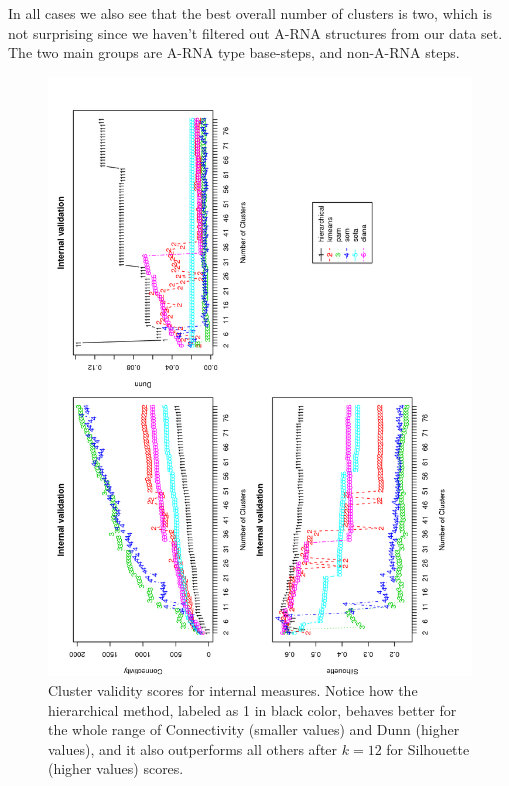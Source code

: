 In all cases  we also see that the best overall  number of clusters is
two, which is not surprising since we haven't filtered out A-RNA
structures from our  data set. The two main  groups are A-RNA
type base-steps, and non-A-RNA steps.

\begin{figure}
 \centering
\includegraphics[angle=0, scale=0.38]{Chapter2/STval_int.png}
\caption{Cluster validity scores for internal measures. Notice how the
  hierarchical method, labeled as 1 in black color,
  behaves better for the whole range of Connectivity (smaller values)
  and Dunn (higher values),
  and it also outperforms all others after $k=12$ for Silhouette
  (higher values) scores.}
 \label{fig:internal}
\end{figure}

